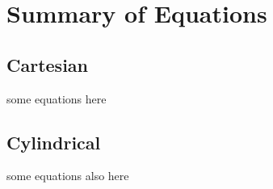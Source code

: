 \chapter{Summary of Equations}
\section{Cartesian}
some equations here

\section{Cylindrical}
some equations also here